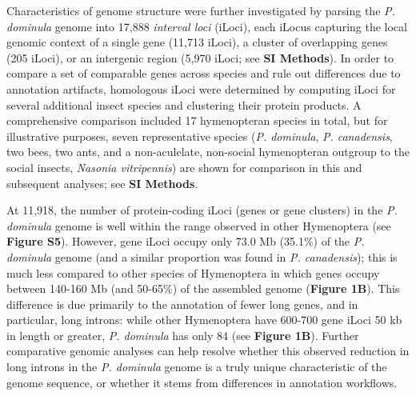 \documentclass[]{article}
\begin{document}
Characteristics of genome structure were further investigated by parsing
the \emph{P. dominula} genome into 17,888 \emph{interval loci} (iLoci),
each iLocus capturing the local genomic context of a single gene (11,713
iLoci), a cluster of overlapping genes (205 iLoci), or an intergenic
region (5,970 iLoci; see \textbf{SI Methods}). In order to compare a set
of comparable genes across species and rule out differences due to
annotation artifacts, homologous iLoci were determined by computing
iLoci for several additional insect species and clustering their protein
products. A comprehensive comparison included 17 hymenopteran species in
total, but for illustrative purposes, seven representative species
(\emph{P. dominula}, \emph{P. canadensis}, two bees, two ants, and a
non-aculelate, non-social hymenopteran outgroup to the social insects,
\emph{Nasonia vitripennis}) are shown for comparison in this and
subsequent analyses; see \textbf{SI Methods}.

At 11,918, the number of protein-coding iLoci (genes or gene clusters)
in the \emph{P. dominula} genome is well within the range observed in
other Hymenoptera (see \textbf{Figure S5}). However, gene iLoci occupy
only 73.0 Mb (35.1\%) of the \emph{P. dominula} genome (and a similar
proportion was found in \emph{P. canadensis}); this is much less
compared to other species of Hymenoptera in which genes occupy between
140-160 Mb (and 50-65\%) of the assembled genome (\textbf{Figure 1B}).
This difference is due primarily to the annotation of fewer long genes,
and in particular, long introns: while other Hymenoptera have 600-700
gene iLoci 50 kb in length or greater, \emph{P. dominula} has only 84
(see \textbf{Figure 1B}). Further comparative genomic analyses can help
resolve whether this observed reduction in long introns in the \emph{P.
dominula} genome is a truly unique characteristic of the genome
sequence, or whether it stems from differences in annotation workflows.
\end{document}
